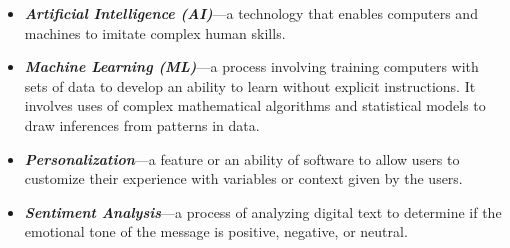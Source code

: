 \begin{itemize}[leftmargin=40pt]
    \item \textbf{\textit{Artificial Intelligence (AI)}}---a technology that enables computers and machines to imitate complex human skills.
    \item \textbf{\textit{Machine Learning (ML)}}---a process involving training computers with sets of data to develop an ability to learn without explicit instructions. It involves uses of complex mathematical algorithms and statistical models to draw inferences from patterns in data.
    \item \textbf{\textit{Personalization}}---a feature or an ability of software to allow users to customize their experience with variables or context given by the users.
    \item \textbf{\textit{Sentiment Analysis}}---a process of analyzing digital text to determine if the emotional tone of the message is positive, negative, or neutral.
\end{itemize}